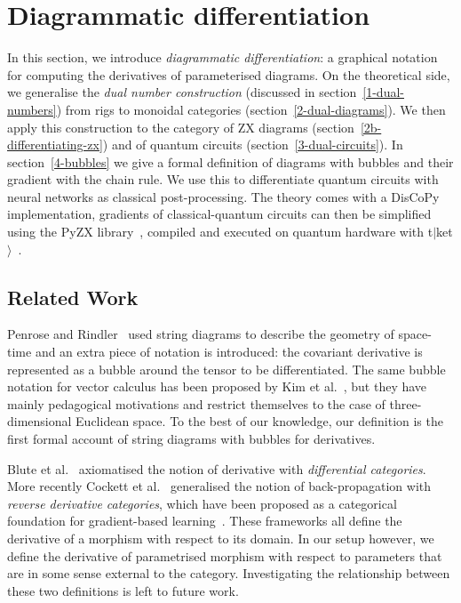 
\section{Diagrammatic differentiation}

In this section, we introduce \emph{diagrammatic differentiation}: a graphical notation for computing the derivatives of parameterised diagrams.
On the theoretical side, we generalise the \emph{dual number construction} (discussed in section~\ref{1-dual-numbers}) from rigs to monoidal categories (section~\ref{2-dual-diagrams}).
We then apply this construction to the category of ZX diagrams (section~\ref{2b-differentiating-zx}) and of quantum circuits (section~\ref{3-dual-circuits}).
In section~\ref{4-bubbles} we give a formal definition of diagrams with bubbles and their gradient with the chain rule.
We use this to differentiate quantum circuits with neural networks as classical post-processing.
The theory comes with a DisCoPy implementation, gradients of classical-quantum circuits can then
be simplified using the PyZX library~\cite{KissingerVanDeWetering19}, compiled and executed
on quantum hardware with t$\vert$ket$\rangle$~\cite{SivarajahEtAl20}.

\subsection*{Related Work}

Penrose and Rindler~\cite{PenroseRindler84} used string diagrams to describe the geometry of space-time and an extra piece of notation is introduced: the covariant derivative is represented as a bubble around the tensor to be differentiated.
The same bubble notation for vector calculus has been proposed by Kim et al.~\cite{KimEtAl20}, but they have mainly pedagogical motivations and restrict themselves to the case of three-dimensional Euclidean space.
To the best of our knowledge, our definition is the first formal account of string diagrams with bubbles for derivatives.

Blute et al.~\cite{BluteEtAl06} axiomatised the notion of derivative with \emph{differential categories}.
More recently Cockett et al.~\cite{CockettEtAl19} generalised the notion of back-propagation with \emph{reverse derivative categories}, which have been proposed as a categorical foundation for gradient-based learning~\cite{CruttwellEtAl21}.
These frameworks all define the derivative of a morphism with respect to its domain.
In our setup however, we define the derivative of parametrised morphism with respect to parameters that are in some sense external to the category.
Investigating the relationship between these two definitions is left to future work.


